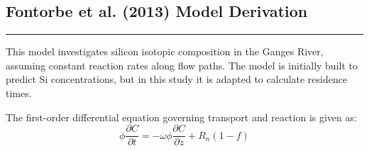 \begin{tcolorbox}[
    colback=white,
    colframe=white,
    sharp corners,
    boxrule=0pt,
    breakable,
    width=\dimexpr\textwidth+1cm\relax,
    enlarge left by=-0.5cm,
    leftrule=0mm, rightrule=0mm, toprule=0mm, bottomrule=0mm
]




\subsection*{Fontorbe et al. (2013) Model Derivation}
\vspace{-5mm}
{\footnotesize

\noindent\rule{\textwidth}{0.5pt}

This model investigates silicon isotopic composition in the Ganges River, assuming constant reaction rates along flow paths. The model is initially built to predict Si concentrations, but in this study it is adapted to calculate residence times.

\begin{multicols}{2}

    The first-order differential equation governing transport and reaction is given as:
    \vspace{10mm}
    \columnbreak
    \begin{equation}
    \phi \frac{\partial C}{\partial t} = -\omega \phi \frac{\partial C}{\partial z} + R_n(1-f)
    \end{equation} 
    
\end{multicols}

    
}
\end{tcolorbox}
